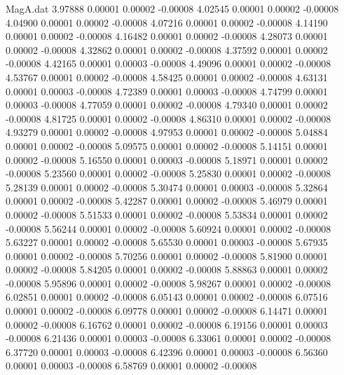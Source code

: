 \begin{filecontents}{MagA.dat}
   3.97888    0.00001    0.00002   -0.00008
   4.02545    0.00001    0.00002   -0.00008
   4.04900    0.00001    0.00002   -0.00008
   4.07216    0.00001    0.00002   -0.00008
   4.14190    0.00001    0.00002   -0.00008
   4.16482    0.00001    0.00002   -0.00008
   4.28073    0.00001    0.00002   -0.00008
   4.32862    0.00001    0.00002   -0.00008
   4.37592    0.00001    0.00002   -0.00008
   4.42165    0.00001    0.00003   -0.00008
   4.49096    0.00001    0.00002   -0.00008
   4.53767    0.00001    0.00002   -0.00008
   4.58425    0.00001    0.00002   -0.00008
   4.63131    0.00001    0.00003   -0.00008
   4.72389    0.00001    0.00003   -0.00008
   4.74799    0.00001    0.00003   -0.00008
   4.77059    0.00001    0.00002   -0.00008
   4.79340    0.00001    0.00002   -0.00008
   4.81725    0.00001    0.00002   -0.00008
   4.86310    0.00001    0.00002   -0.00008
   4.93279    0.00001    0.00002   -0.00008
   4.97953    0.00001    0.00002   -0.00008
   5.04884    0.00001    0.00002   -0.00008
   5.09575    0.00001    0.00002   -0.00008
   5.14151    0.00001    0.00002   -0.00008
   5.16550    0.00001    0.00003   -0.00008
   5.18971    0.00001    0.00002   -0.00008
   5.23560    0.00001    0.00002   -0.00008
   5.25830    0.00001    0.00002   -0.00008
   5.28139    0.00001    0.00002   -0.00008
   5.30474    0.00001    0.00003   -0.00008
   5.32864    0.00001    0.00002   -0.00008
   5.42287    0.00001    0.00002   -0.00008
   5.46979    0.00001    0.00002   -0.00008
   5.51533    0.00001    0.00002   -0.00008
   5.53834    0.00001    0.00002   -0.00008
   5.56244    0.00001    0.00002   -0.00008
   5.60924    0.00001    0.00002   -0.00008
   5.63227    0.00001    0.00002   -0.00008
   5.65530    0.00001    0.00003   -0.00008
   5.67935    0.00001    0.00002   -0.00008
   5.70256    0.00001    0.00002   -0.00008
   5.81900    0.00001    0.00002   -0.00008
   5.84205    0.00001    0.00002   -0.00008
   5.88863    0.00001    0.00002   -0.00008
   5.95896    0.00001    0.00002   -0.00008
   5.98267    0.00001    0.00002   -0.00008
   6.02851    0.00001    0.00002   -0.00008
   6.05143    0.00001    0.00002   -0.00008
   6.07516    0.00001    0.00002   -0.00008
   6.09778    0.00001    0.00002   -0.00008
   6.14471    0.00001    0.00002   -0.00008
   6.16762    0.00001    0.00002   -0.00008
   6.19156    0.00001    0.00003   -0.00008
   6.21436    0.00001    0.00003   -0.00008
   6.33061    0.00001    0.00002   -0.00008
   6.37720    0.00001    0.00003   -0.00008
   6.42396    0.00001    0.00003   -0.00008
   6.56360    0.00001    0.00003   -0.00008
   6.58769    0.00001    0.00002   -0.00008

\end{filecontents}
